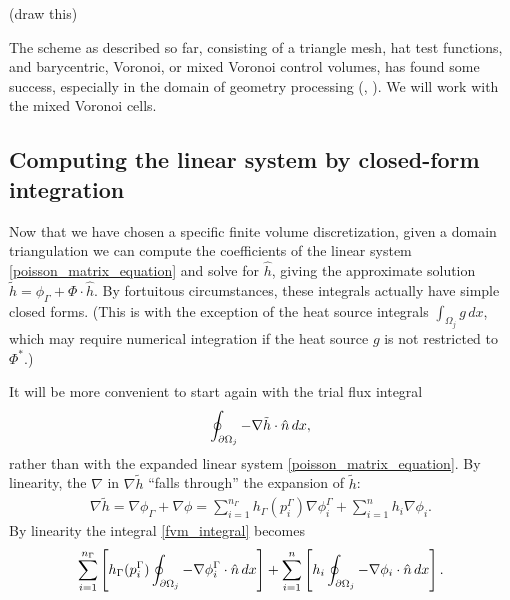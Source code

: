\vskip 0.2in
(draw this)
\vskip 0.2in

The scheme as described so far, consisting of a triangle mesh, hat test functions, and barycentric, Voronoi, or mixed Voronoi control volumes,
has found some success, especially in the domain of geometry processing (\cite{polygon_mesh_processing}, \cite{ddg_triangulated}).
We will work with the mixed Voronoi cells.

\subsection{Computing the linear system by closed-form integration}
Now that we have chosen a specific finite volume discretization, given a domain triangulation we can compute
the coefficients of the linear system \eqref{poisson_matrix_equation} and solve for $\hat{h}$, giving
the approximate solution $\tilde{h} = \phi_\Gamma + \Phi\cdot \hat{h}$.
By fortuitous circumstances, these integrals actually have simple closed forms.
(This is with the exception of the heat source integrals $\int_{\Omega_j}g\,dx$,
which may require numerical integration if the heat source $g$ is not restricted to $\Phi^*$.)

It will be more convenient to start again with the trial flux integral
\newcommand{\fvmintegral}{
\oint_{\pom_j} -\nabla \tilde{h}\cdot\hat{n}\,dx
}
\begin{equation}\label{fvm_integral}
\fvmintegral,
\end{equation}
rather than with the expanded linear system \eqref{poisson_matrix_equation}.
By linearity, the $\nabla$ in $\nabla\tilde{h}$ ``falls through'' the expansion of $\tilde{h}$:
\begin{align*}
    \nabla \tilde{h} = \nabla\phi_\Gamma + \nabla\phi
             = \sum_{i=1}^{n_\Gamma}h_\Gamma(p^\Gamma_i)\nabla\phi^\Gamma_i + \sum_{i=1}^n h_i\nabla\phi_i.
\end{align*}
By linearity the integral \eqref{fvm_integral} becomes
\begin{equation}\label{fvm_integral_linearity_expanded}
    \sum_{i=1}^{n_\Gamma}\left[h_\Gamma(p^\Gamma_i)\oint_{{\partial\Omega}_j}-\nabla\phi^\Gamma_i\cdot\hat{n}\,dx\right]
    + \sum_{i=1}^n\left[h_i\oint_{{\partial\Omega}_j}-\nabla\phi_i\cdot\hat{n}\,dx\right].
\end{equation}

